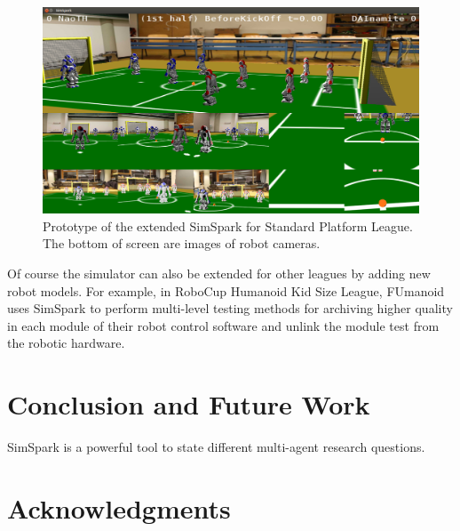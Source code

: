 \documentclass{llncs}
\begin{document}
\begin{figure}
  \centering
  \includegraphics[width = 0.75\columnwidth]{simspark-spl}
  \caption{Prototype of the extended SimSpark for Standard Platform League.
    The bottom of screen are images of robot cameras.}
  \label{f:simspark-spl}
\end{figure}

Of course the simulator can also be extended for other leagues by adding new robot models.
For example, in RoboCup Humanoid Kid Size League, FUmanoid\cite{Donat2012} uses
SimSpark to perform multi-level testing methods for archiving higher
quality in each module of their robot control software and unlink the
module test from the robotic hardware.


\section{Conclusion and Future Work}

SimSpark is a powerful tool to state different multi-agent research questions.


\section*{Acknowledgments}



\end{document}
